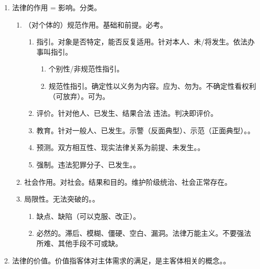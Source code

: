 \begin{enumerate}
\begin{enumerate}
          \item 以权利和义务为内容的社会规范。权义一致、权利本位。
          \item 国家强制力和程序性规定。vs 道德强制力、宗教强制力。
          \item 可诉性。宪法除外。
        \end{enumerate}
  \item 法律的作用 = 影响。分类。
        \begin{enumerate}
          \item （对个体的）规范作用。基础和前提。必考。
                \begin{enumerate}
                  \item 指引。对象是否特定，能否反复适用。针对本人、未/将发生。依法办事叫指引。
                        \begin{enumerate}
                          \item 个别性/非规范性指引。
                          \item 规范性指引。\yi 确定性以义务为内容。应为、勿为。\er 不确定性看权利（可放弃）。可为。
                        \end{enumerate}
                  \item 评价。针对他人、已发生、结果合法 \hz 违法。判决即评价。
                  \item 教育。针对一般人、已发生。示警（反面典型）、示范（正面典型）。。
                  \item 预测。双方相互性、现实法律关系为前提、未发生。。
                  \item 强制。违法犯罪分子、已发生。。
                \end{enumerate}
          \item 社会作用。对社会。结果和目的。维护阶级统治、社会正常存在。
          \item 局限性。无法突破的。。
                \begin{enumerate}
                  \item \bdy 缺点、缺陷（可以克服、改正）。
                  \item 必然的。滞后、模糊、僵硬、空白、漏洞。法律万能主义。不要强法所难、其他手段不可或缺。
                \end{enumerate}
        \end{enumerate}
  \item 法律的价值。价值指客体对主体需求的满足，是主客体相关的概念。。

\end{enumerate}
